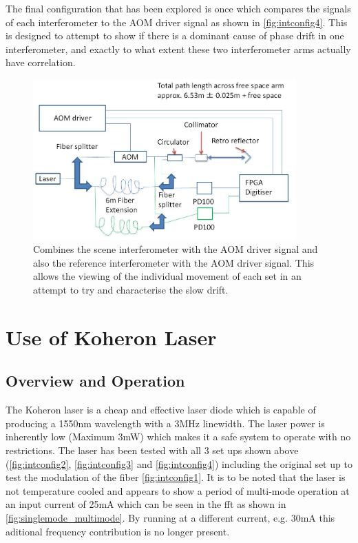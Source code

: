 \documentclass[12pt,a4paper,oneside]{report}
\begin{document}
The final configuration that has been explored is once which compares the signals of each interferometer to the AOM driver signal as shown in \autoref{fig:intconfig4}. This is designed to attempt to show if there is a dominant cause of phase drift in one interferometer, and exactly to what extent these two interferometer arms actually have correlation.
\begin{figure}[H] 
\includegraphics[width=0.9\textwidth, center,angle=0]{DImages/intconfig4.JPG}
\caption{Combines the scene interferometer with the AOM driver signal and also the reference interferometer with the AOM driver signal. This allows the viewing of the individual movement of each set in an attempt to try and characterise the slow drift.}
\label{fig:intconfig4}
\end{figure}




\chapter{Use of Koheron Laser}
\section{Overview and Operation}
The Koheron laser is a cheap and effective laser diode which is capable of producing a 1550nm wavelength with a 3MHz linewidth. The laser power is inherently low (Maximum 3mW) which makes it a safe system to operate with no restrictions. The laser has been tested with all 3 set ups shown above (\autoref{fig:intconfig2}, \autoref{fig:intconfig3} and \autoref{fig:intconfig4}) including the original set up to test the modulation of the fiber \autoref{fig:intconfig1}. It is to be noted that the laser is not temperature cooled and appears to show a period of multi-mode operation at an input current of 25mA which can be seen in the fft as shown in \autoref{fig:singlemode_multimode}. By running at a different current, e.g. 30mA this aditional frequency contribution is no longer present.
\end{document}
